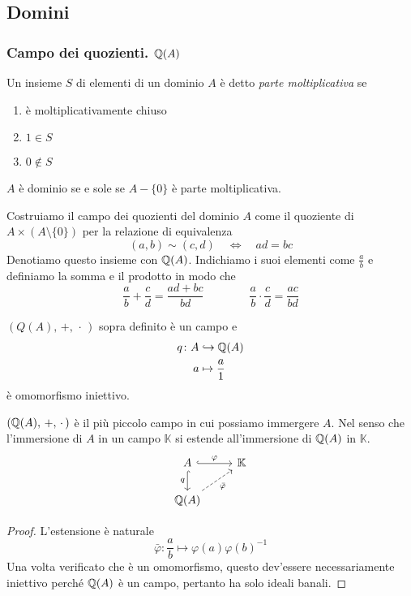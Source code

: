 \subsection{Domini}
\begin{multicols}{2}

\subsubsection{Campo dei quozienti. $ \mathbb{Q}(A) $}

\begin{definition}
	Un insieme $ S $ di elementi di un dominio $ A $ è detto \emph{parte moltiplicativa} se
	\begin{enumerate}
		\item è moltiplicativamente chiuso
		\item $ 1 \in S $
		\item $ 0 \notin S $
	\end{enumerate}
\end{definition}

\begin{remark}
	$ A $ è dominio se e sole se $ A - \{0\} $ è parte moltiplicativa.
\end{remark}

Costruiamo il campo dei quozienti del dominio $ A $ come il quoziente di $ A \times (A \setminus \{0\}) $ per la relazione di equivalenza $$  (a, b) \sim (c, d) \quad\Leftrightarrow\quad ad = bc $$
Denotiamo questo insieme con $ \mathbb{Q}(A) $. Indichiamo i suoi elementi come $ \frac{a}{b} $ e definiamo la somma e il prodotto in modo che
\[ \frac{a}{b} + \frac{c}{d} = \frac{ad + bc}{bd} \qquad\qquad \frac{a}{b}\cdot \frac{c}{d} = \frac{ac}{bd} \]

\begin{remark}
	$ (Q(A),\, +,\, \cdot\,) $ sopra definito è un campo e
	\begin{align*}
	q \colon A &\hookrightarrow \mathbb{Q}(A) \\
	a &\mapsto \frac{a}{1}
	\end{align*}
	è omomorfismo iniettivo.
\end{remark}

\begin{theorem}
	$ (\mathbb{Q}(A),\, +,\, \cdot\,) $ è il più piccolo campo in cui possiamo immergere $ A $. Nel senso che l'immersione di $ A $ in un campo $ \mathbb{K} $ si estende all'immersione di $ \mathbb{Q}(A) $ in $ \mathbb{K} $.
	\[ \begin{tikzcd}
	A \arrow[hook]{r}{\varphi} \arrow[swap, hook]{d}{q} & \K \\
	\Q(A) \arrow[swap, dashed]{ru}{\bar{\varphi}}
	\end{tikzcd} \]
\end{theorem}
\begin{proof}
	L'estensione è naturale
	\[ \bar{\varphi}: \frac{a}{b} \mapsto \varphi(a) \varphi(b)^{-1} \]
	Una volta verificato che è un omomorfismo, questo dev'essere necessariamente iniettivo perché $ \mathbb{Q}(A) $ è un campo, pertanto ha solo ideali banali.
\end{proof}


\end{multicols}

